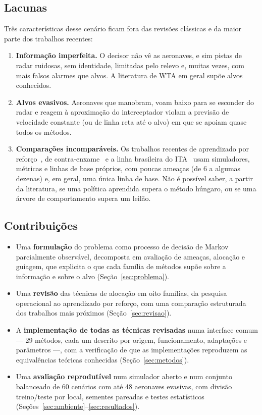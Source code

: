 \documentclass[11pt,a4paper]{article}
\begin{document}
\subsection{Lacunas}
Três características desse cenário ficam fora das revisões clássicas e da maior parte dos trabalhos recentes:
\begin{enumerate}
  \item \textbf{Informação imperfeita.} O decisor não vê as aeronaves, e sim pistas de radar ruidosas, sem identidade,
        limitadas pelo relevo e, muitas vezes, com mais falsos alarmes que alvos. A literatura de WTA em geral supõe alvos
        conhecidos.
  \item \textbf{Alvos evasivos.} Aeronaves que manobram, voam baixo para se esconder do radar e reagem à aproximação do
        interceptador violam a previsão de velocidade constante (ou de linha reta até o alvo) em que se apoiam quase todos
        os métodos.
  \item \textbf{Comparações incomparáveis.} Os trabalhos recentes de aprendizado por
        reforço~\cite{liu2023drones,palmas2025,jia2026}, de contra-enxame~\cite{strickland2018} e a linha brasileira do
        ITA~\cite{ricardo2023,feitosa2025,afonso2020,cruz2025} usam simuladores, métricas e linhas de base próprios, com
        poucas ameaças (de 6 a algumas dezenas) e, em geral, uma única linha de base. Não é possível saber, a partir da
        literatura, se uma política aprendida supera o método húngaro, ou se uma árvore de comportamento supera um leilão.
\end{enumerate}

\subsection{Contribuições}
\begin{itemize}
  \item Uma \textbf{formulação} do problema como processo de decisão de Markov parcialmente observável, decomposta em
        avaliação de ameaças, alocação e guiagem, que explicita o que cada família de métodos supõe sobre a informação e
        sobre o alvo (Seção~\ref{sec:problema}).
  \item Uma \textbf{revisão} das técnicas de alocação em oito famílias, da pesquisa operacional ao aprendizado por
        reforço, com uma comparação estruturada dos trabalhos mais próximos (Seção~\ref{sec:revisao}).
  \item A \textbf{implementação de todas as técnicas revisadas} numa interface comum --- 29 métodos, cada um descrito por
        origem, funcionamento, adaptações e parâmetros ---, com a verificação de que as implementações reproduzem as
        equivalências teóricas conhecidas (Seção~\ref{sec:metodos}).
  \item Uma \textbf{avaliação reprodutível} num simulador aberto e num conjunto balanceado de 60 cenários com até 48
        aeronaves evasivas, com divisão treino/teste por local, sementes pareadas e testes estatísticos
        (Seções~\ref{sec:ambiente}--\ref{sec:resultados}).
\end{itemize}
\end{document}
